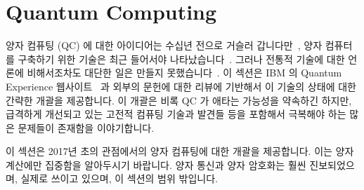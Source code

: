 
\section{Quantum Computing}
\label{sec:future:Quantum Computing}

양자 컴퓨팅 (QC) 에 대한 아이디어는 수십년 전으로 거슬러
갑니다만~\cite{RichardPFeynman1959RoomAtBottom,Bennett:1973:LRC:1664562.1664568,RichardFeynman1986QuantumMechanicalComputers},
양자 컴퓨터를 구축하기 위한 기술은 최근 들어서야
나타났습니다~\cite{KamranKarimi2011D-WaveAdiabatic,IBM2016QuantumExperience}.
그러나 전통적 기술에 대한 언론에 비해서조차도 대단한 일은 만들지
못했습니다~\cite{Economist2017QuantumComputingTechnologyQuarterly}.
이 섹션은 IBM 의 Quantum Experience 웹사이트~\cite{IBM2016QuantumExperience} 과
외부의 문헌에 대한 리뷰에 기반해서 이 기술의 상태에 대한 간략한 개괄을
제공합니다.
이 개괄은 비록 QC 가 애타는 가능성을 약속하긴 하지만, 급격하게 개선되고 있는
고전적 컴퓨팅 기술과 발견들 등을 포함해서 극복해야 하는 많은 문제들이 존재함을
이야기합니다.

이 섹션은 2017년 초의 관점에서의 양자 컴퓨팅에 대한 개괄을 제공합니다.
이는 양자 계산에만 집중함을 알아두시기 바랍니다.
양자 통신과 양자 암호화는 훨씬 진보되었으며, 실제로 쓰이고 있으며, 이 섹션의
범위 밖입니다.

